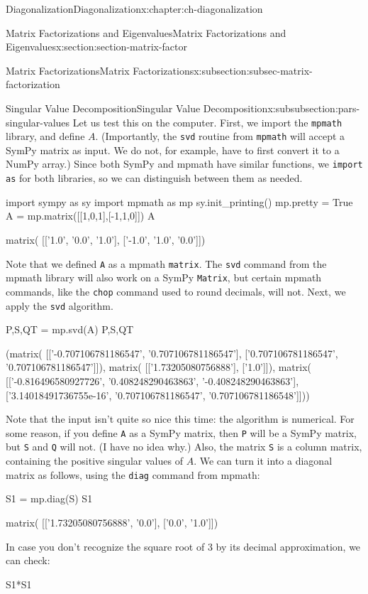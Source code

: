 \documentclass[oneside,10pt,]{book}
\newcommand{\mono}[1]{\texttt{#1}}
\numberwithin{equation}{section}
\begin{document}
\begin{chapterptx}{Diagonalization}{}{Diagonalization}{}{}{x:chapter:ch-diagonalization}
\begin{sectionptx}{Matrix Factorizations and Eigenvalues}{}{Matrix Factorizations and Eigenvalues}{}{}{x:section:section-matrix-factor}
\begin{subsectionptx}{Matrix Factorizations}{}{Matrix Factorizations}{}{}{x:subsection:subsec-matrix-factorization}
\begin{subsubsectionptx}{Singular Value Decomposition}{}{Singular Value Decomposition}{}{}{x:subsubsection:pars-singular-values}
Let us test this on the computer. First, we import the \mono{mpmath} library, and define \(A\). (Importantly, the \mono{svd} routine from \mono{mpmath} will accept a SymPy matrix as input. We do not, for example, have to first convert it to a NumPy array.) Since both SymPy and mpmath have similar functions, we \mono{import as}  for both libraries, so we can distinguish between them as needed.%
\begin{sageinput}
import sympy as sy
import mpmath as mp
sy.init_printing()
mp.pretty = True
A = mp.matrix([[1,0,1],[-1,1,0]])
A
\end{sageinput}
\begin{sageoutput}
matrix(
[['1.0', '0.0', '1.0'],
 ['-1.0', '1.0', '0.0']])
\end{sageoutput}
Note that we defined \mono{A} as a mpmath \mono{matrix}. The \mono{svd} command from the mpmath library will also work on a SymPy \mono{Matrix}, but certain mpmath commands, like the \mono{chop} command used to round decimals, will not. Next, we apply the \mono{svd} algorithm.%
\begin{sageinput}
P,S,QT = mp.svd(A)
P,S,QT
\end{sageinput}
\begin{sageoutput}
(matrix(
 [['-0.707106781186547', '0.707106781186547'],
  ['0.707106781186547', '0.707106781186547']]),
 matrix(
 [['1.73205080756888'],
  ['1.0']]),
 matrix(
 [['-0.816496580927726', '0.408248290463863', '-0.408248290463863'],
  ['3.14018491736755e-16', '0.707106781186547', '0.707106781186548']]))
\end{sageoutput}
Note that the input isn't quite so nice this time: the algorithm is numerical. For some reason, if you define \mono{A} as a SymPy matrix, then \mono{P} will be a SymPy matrix, but \mono{S} and \mono{Q} will not. (I have no idea why.) Also, the matrix \mono{S} is a column matrix, containing the positive singular values of \(A\). We can turn it into a diagonal matrix as follows, using the \mono{diag} command from mpmath:%
\begin{sageinput}
S1 = mp.diag(S)
S1
\end{sageinput}
\begin{sageoutput}
matrix(
[['1.73205080756888', '0.0'],
 ['0.0', '1.0']])
\end{sageoutput}
In case you don't recognize the square root of 3 by its decimal approximation, we can check:%
\begin{sageinput}
S1*S1
\end{sageinput}
\begin{sageoutput}

\end{sageoutput}
\end{subsubsectionptx}
\end{subsectionptx}
\end{sectionptx}
\end{chapterptx}
\end{document}
